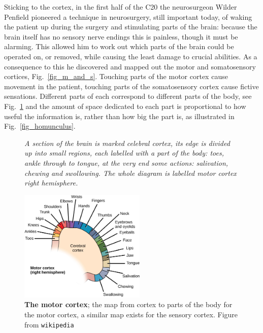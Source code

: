 \documentclass[12pt]{article}
\begin{document}
Sticking to the cortex, in the first half of the C20 the neurosurgeon
Wilder Penfield pioneered a technique in neurosurgery, still important
today, of waking the patient up during the surgery and stimulating
parts of the brain: because the brain itself has no sensory nerve
endings this is painless, though it must be alarming. This allowed him
to work out which parts of the brain could be operated on, or removed,
while causing the least damage to crucial abilities. As a consequence
to this he discovered and mapped out the motor and somatosensory cortices,
Fig.~\ref{fig_m_and_s}. Touching parts of the motor cortex cause
movement in the patient, touching parts of the somatosensory cortex cause
fictive sensations. Different parts of each correspond to different
parts of the body, see Fig.~\ref{fig_motor} and the amount of space
dedicated to each part is proportional to how useful the information
is, rather than how big the part is, as illustrated in Fig.~\ref{fig_homunculus}.

\begin{figure}[tbhp]
           {\textsl{A section of the brain is marked celebral cortex, its edge is divided up into small regions, each labelled with a part of the body: toes, ankle through to tongue, at the very end some actions: salivation, chewing and swollowing. The whole diagram is labelled motor cortex right hemisphere.}}
{
  \begin{center}
  \includegraphics[width=6cm]{motor_mapping.jpg}
  \end{center}
  }
  
  \caption{\textbf{The motor cortex}; the map from cortex to parts of the body for the motor cortex, a similar map exists for the sensory cortex. Figure from
    \texttt{wikipedia}\label{fig_motor}}
\end{figure}
\end{document}
